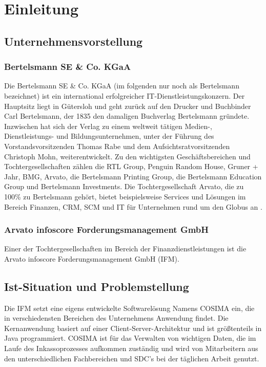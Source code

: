 \section{Einleitung}


\subsection{Unternehmensvorstellung}
\subsubsection{Bertelsmann SE \& Co. KGaA} Die Bertelsmann SE \& Co. KGaA (im folgenden nur noch als Bertelsmann bezeichnet) ist ein international erfolgreicher IT-Dienstleistungskonzern. Der Hauptsitz liegt in Gütersloh und geht zurück auf den Drucker und Buchbinder Carl Bertelsmann, der 1835 den damaligen Buchverlag Bertelsmann gründete. Inzwischen hat sich der Verlag zu einem weltweit tätigen Medien-, Dienstleistungs- und Bildungsunternehmen, unter der Führung des Vorstandsvorsitzenden Thomas Rabe und dem Aufsichtsratvorsitzenden Christoph Mohn, weiterentwickelt. Zu den wichtigsten Geschäftsbereichen und Tochtergesellschaften zählen die RTL Group, Penguin Random House, Gruner + Jahr, BMG, Arvato, die Bertelsmann Printing Group, die Bertelsmann Education Group und Bertelsmann Investments. Die Tochtergesellschaft Arvato, die zu 100\% zu Bertelsmann gehört, bietet beispielsweise Services und Lösungen im Bereich Finanzen, CRM, SCM und IT für Unternehmen rund um den Globus an \citep{BertelsmannGeschaeftsbericht2016}.

\subsubsection{Arvato infoscore Forderungsmanagement GmbH}
Einer der Tochtergesellschaften im Bereich der Finanzdienstleistungen ist die Arvato infoscore Forderungsmanagement GmbH (IFM).

\subsection{Ist-Situation und Problemstellung}
Die IFM setzt eine eigens entwickelte Softwarelösung Namens COSIMA ein, die in verschiedensten Bereichen des Unternehmens Anwendung findet. Die Kernanwendung basiert auf einer Client-Server-Architektur und ist größtenteils in Java programmiert. COSIMA ist für das Verwalten von wichtigen Daten, die im Laufe des Inkassoprozesses aufkommen zuständig und wird von Mitarbeitern aus den unterschiedlichen Fachbereichen und \gls{SDC}'s bei der täglichen Arbeit genutzt.

